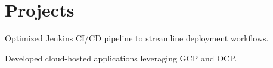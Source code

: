\documentclass[]{deedy-resume-reversed}
\begin{document}
\begin{minipage}[t]{0.60\textwidth}

\section{Projects}
\begin{tightemize}
\item Optimized Jenkins CI/CD pipeline to streamline deployment workflows.
\end{tightemize}
\sectionsep

\begin{tightemize}
\item Developed cloud-hosted applications leveraging GCP and OCP.
\end{tightemize}
\sectionsep


\end{minipage}
\hfill
\end{document}
